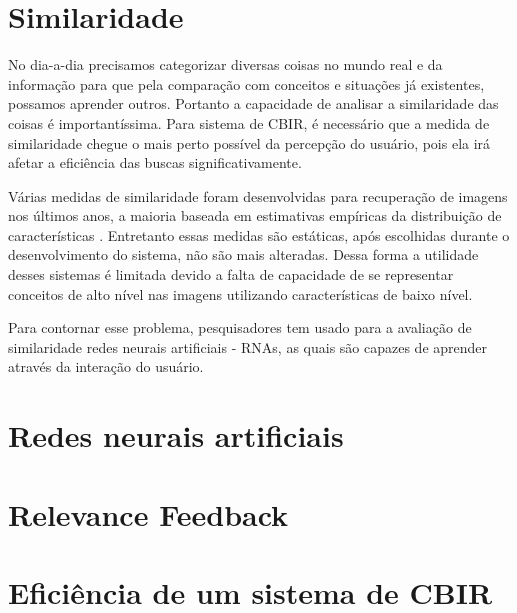 \section{Similaridade}

No dia-a-dia precisamos categorizar diversas coisas no mundo real e da informação para que pela comparação com conceitos e situações já existentes, possamos aprender outros. Portanto a capacidade de analisar a similaridade das coisas é importantíssima. Para sistema de CBIR, é necessário que a medida de similaridade chegue o mais perto possível da percepção do usuário, pois ela irá afetar a eficiência das buscas significativamente.

Várias medidas de similaridade foram desenvolvidas para recuperação de imagens nos últimos anos, a maioria baseada em estimativas empíricas da distribuição de características \cite{feng-chapter}. Entretanto essas medidas são estáticas, após escolhidas durante o desenvolvimento do sistema, não são mais alteradas. Dessa forma a utilidade desses sistemas é limitada devido a falta de capacidade de se representar conceitos de alto nível nas imagens utilizando características de baixo nível.

Para contornar esse problema, pesquisadores \cite{mammography} \cite{cbir-nn-general} tem usado para a avaliação de similaridade redes neurais artificiais - RNAs, as quais são capazes de aprender através da interação do usuário.

\section{Redes neurais artificiais}



\section{Relevance Feedback}

\section{Eficiência de um sistema de CBIR}

